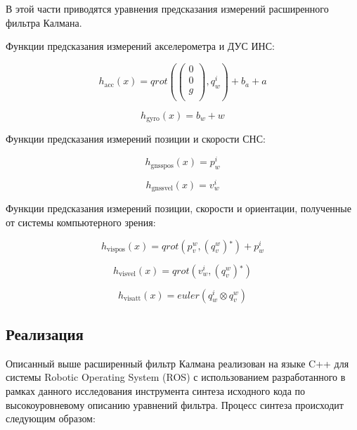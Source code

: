 \documentclass[11pt,a4paper]{article}
\begin{document}
В этой части приводятся уравнения предсказания измерений расширенного фильтра Калмана.

Функции предсказания измерений акселерометра и ДУС ИНС:

\begin{equation}
    h_{\text{acc}}(x)=qrot\left(\left(
    \begin{array}{c}
    0 \\
    0 \\
    g \\
    \end{array}
    \right),q_w^i\right)+b_a+a
\end{equation}

\begin{equation}
    h_{\text{gyro}}(x)=b_w+w
\end{equation}

Функции предсказания измерений позиции и скорости СНС:

\begin{equation}
    h_{\text{gnsspos}}(x)=p_w^i
\end{equation}

\begin{equation}
    h_{\text{gnssvel}}(x)=v_w^i
\end{equation}

Функции предсказания измерений позиции, скорости и ориентации, полученные от системы компьютерного зрения:

\begin{equation}
    h_{\text{vispos}}(x)=qrot\left(p_v^w,\left(q_v^w\right){}^*\right)+p_w^i
\end{equation}

\begin{equation}
    h_{\text{visvel}}(x)=qrot\left(v_w^i,\left(q_v^w\right){}^*\right)
\end{equation}

\begin{equation}
    h_{\text{visatt}}(x)=euler\left(q_w^i\otimes q_v^w\right)
\end{equation}

\subsection{Реализация}

Описанный выше расширенный фильтр Калмана реализован на языке C++ для системы Robotic Operating System (ROS) \cite{ROS} с использованием разработанного в рамках данного исследования инструмента синтеза исходного кода по высокоуровневому описанию уравнений фильтра. Процесс синтеза происходит следующим образом:
\end{document}
